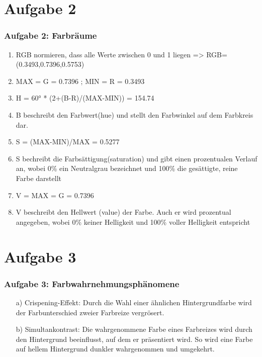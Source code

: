 \documentclass[accentcolor=tud9c,colorbacktitle,inverttitle,landscape,german,presentation,t]{tudbeamer}
\begin{document}
\section{Aufgabe 2}
	\begin{frame}
		\frametitle{Aufgabe 2: Farbräume}
			\begin{enumerate}
			\item RGB normieren, dass alle Werte zwischen 0 und 1 liegen => RGB=(0.3493,0.7396,0.5753) 
			\item MAX = G = 0.7396   ;    MIN = R = 0.3493
			\item  H = 60° * (2+(B-R)/(MAX-MIN)) = 154.74
			\item  B beschreibt den Farbwert(hue) und stellt den Farbwinkel auf dem Farbkreis dar.
			\item S = (MAX-MIN)/MAX = 0.5277
			\item S bechreibt die Farbsättigung(saturation) und gibt einen prozentualen Verlauf an, wobei 0\% ein Neutralgrau bezeichnet und 100\% die gesättigte, reine Farbe darstellt \
			\item V = MAX = G = 0.7396
			\item V beschreibt den Hellwert (value) der Farbe. Auch er wird prozentual angegeben, wobei 0\% keiner Helligkeit und 100\% voller Helligkeit entspricht
			\end{enumerate}
		\end{frame}

\section{Aufgabe 3}
	\begin{frame}
		\frametitle{Aufgabe 3: Farbwahrnehmungsphänomene}
		\begin{itemize}
			\item[a)]Crispening-Effekt: Durch die Wahl einer ähnlichen Hintergrundfarbe wird der Farbunterschied zweier Farbreize vergrösert.
			\item[b)]Simultankontrast: Die wahrgenommene Farbe eines Farbreizes wird durch den Hintergrund beeinflusst, auf dem er präsentiert wird. So wird eine Farbe auf hellem Hintergrund dunkler wahrgenommen und umgekehrt.
		\end{itemize}
	\end{frame}
\end{document}
